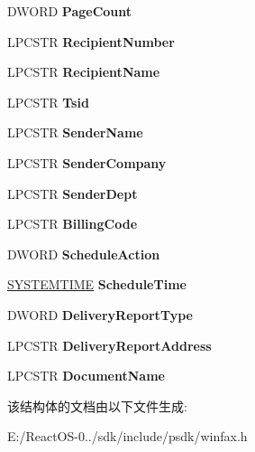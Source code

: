 \begin{DoxyCompactItemize}
D\+W\+O\+RD {\bfseries Page\+Count}
\item 
\mbox{\label{struct___f_a_x___j_o_b___e_n_t_r_y_a_ae0a192871d08095420342d7f5f3e36ac}} 
L\+P\+C\+S\+TR {\bfseries Recipient\+Number}
\item 
\mbox{\label{struct___f_a_x___j_o_b___e_n_t_r_y_a_a072c3e5b2bd4b2820b9867c15e0fe4cf}} 
L\+P\+C\+S\+TR {\bfseries Recipient\+Name}
\item 
\mbox{\label{struct___f_a_x___j_o_b___e_n_t_r_y_a_a3f6a20d8d3944e35790f58f2bf1be54c}} 
L\+P\+C\+S\+TR {\bfseries Tsid}
\item 
\mbox{\label{struct___f_a_x___j_o_b___e_n_t_r_y_a_aa9897f6fa295e671590d29fe6c0d76ac}} 
L\+P\+C\+S\+TR {\bfseries Sender\+Name}
\item 
\mbox{\label{struct___f_a_x___j_o_b___e_n_t_r_y_a_ad67e3878be4405bddc792e81e3c90378}} 
L\+P\+C\+S\+TR {\bfseries Sender\+Company}
\item 
\mbox{\label{struct___f_a_x___j_o_b___e_n_t_r_y_a_a164607dc8b57f158936bf7ebebb7990c}} 
L\+P\+C\+S\+TR {\bfseries Sender\+Dept}
\item 
\mbox{\label{struct___f_a_x___j_o_b___e_n_t_r_y_a_a31e3f31e247243a7ef81e0061af6ac2e}} 
L\+P\+C\+S\+TR {\bfseries Billing\+Code}
\item 
\mbox{\label{struct___f_a_x___j_o_b___e_n_t_r_y_a_aeee5b6cf8fc2a43e15d38434d40cfb46}} 
D\+W\+O\+RD {\bfseries Schedule\+Action}
\item 
\mbox{\label{struct___f_a_x___j_o_b___e_n_t_r_y_a_a7191b518fdae2be2a8e930feed21a981}} 
\hyperlink{struct___s_y_s_t_e_m_t_i_m_e}{S\+Y\+S\+T\+E\+M\+T\+I\+ME} {\bfseries Schedule\+Time}
\item 
\mbox{\label{struct___f_a_x___j_o_b___e_n_t_r_y_a_a33696b662f70e1010f544d21c1a1e232}} 
D\+W\+O\+RD {\bfseries Delivery\+Report\+Type}
\item 
\mbox{\label{struct___f_a_x___j_o_b___e_n_t_r_y_a_a648b0bab549fda671f06586d7cdb367c}} 
L\+P\+C\+S\+TR {\bfseries Delivery\+Report\+Address}
\item 
\mbox{\label{struct___f_a_x___j_o_b___e_n_t_r_y_a_a8f7c854a77e5207dbe5f81975377bdd2}} 
L\+P\+C\+S\+TR {\bfseries Document\+Name}
\end{DoxyCompactItemize}


该结构体的文档由以下文件生成\+:\begin{DoxyCompactItemize}
\item 
E\+:/\+React\+O\+S-\/0../sdk/include/psdk/winfax.\+h\end{DoxyCompactItemize}
